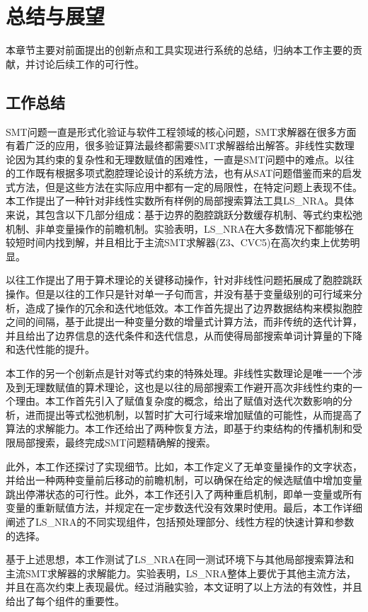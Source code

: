 \chapter{总结与展望}\label{chap:conclusion}

本章节主要对前面提出的创新点和工具实现进行系统的总结，归纳本工作主要的贡献，并讨论后续工作的可行性。

\section{工作总结}
SMT问题一直是形式化验证与软件工程领域的核心问题，SMT求解器在很多方面有着广泛的应用，很多验证算法最终都需要SMT求解器给出解答。非线性实数理论因为其约束的复杂性和无理数赋值的困难性，一直是SMT问题中的难点。以往的工作既有根据多项式胞腔理论设计的系统方法，也有从SAT问题借鉴而来的启发式方法，但是这些方法在实际应用中都有一定的局限性，在特定问题上表现不佳。本工作提出了一种针对非线性实数所有样例的局部搜索算法工具LS\_NRA。具体来说，其包含以下几部分组成：基于边界的胞腔跳跃分数缓存机制、等式约束松弛机制、非单变量操作的前瞻机制。实验表明，LS\_NRA在大多数情况下都能够在较短时间内找到解，并且相比于主流SMT求解器(Z3、CVC5)在高次约束上优势明显。

以往工作提出了用于算术理论的关键移动操作，针对非线性问题拓展成了胞腔跳跃操作。但是以往的工作只是针对单一子句而言，并没有基于变量级别的可行域来分析，造成了操作的冗余和迭代地低效。本工作首先提出了边界数据结构来模拟胞腔之间的间隔，基于此提出一种变量分数的增量式计算方法，而非传统的迭代计算，并且给出了边界信息的迭代条件和迭代信息，从而使得局部搜索单词计算量的下降和迭代性能的提升。

本工作的另一个创新点是针对等式约束的特殊处理。非线性实数理论是唯一一个涉及到无理数赋值的算术理论，这也是以往的局部搜索工作避开高次非线性约束的一个理由。本工作首先引入了赋值复杂度的概念，给出了赋值对迭代次数影响的分析，进而提出等式松弛机制，以暂时扩大可行域来增加赋值的可能性，从而提高了算法的求解能力。本工作还给出了两种恢复方法，即基于约束结构的传播机制和受限局部搜索，最终完成SMT问题精确解的搜索。

此外，本工作还探讨了实现细节。比如，本工作定义了无单变量操作的文字状态，并给出一种两种变量前后移动的前瞻机制，可以确保在给定的候选赋值中增加变量跳出停滞状态的可行性。此外，本工作还引入了两种重启机制，即单一变量或所有变量的重新赋值方法，并规定在一定步数迭代没有效果时使用。最后，本工作详细阐述了LS\_NRA的不同实现组件，包括预处理部分、线性方程的快速计算和参数的选择。

基于上述思想，本工作测试了LS\_NRA在同一测试环境下与其他局部搜索算法和主流SMT求解器的求解能力。实验表明，LS\_NRA整体上要优于其他主流方法，并且在高次约束上表现最优。经过消融实验，本文证明了以上方法的有效性，并且给出了每个组件的重要性。

